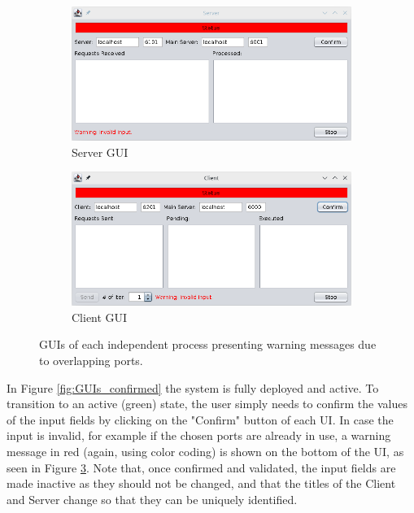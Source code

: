 \documentclass[12pt]{article}
\begin{document}
\begin{figure}[H]
  \centering
  \begin{subfigure}{.5\textwidth}
    \centering
    \includegraphics[width=.95\linewidth]{img/S_wrong.png}
    \caption{Server GUI}
    \label{fig:S_wrong}
  \end{subfigure}%
  \begin{subfigure}{.5\textwidth}
    \centering
    \includegraphics[width=.95\linewidth]{img/C_wrong.png}
    \caption{Client GUI}
    \label{fig:C_wrong}
  \end{subfigure}
  \caption{GUIs of each independent process presenting warning messages due to overlapping ports.}
  \label{fig:GUIs_wrong}
\end{figure}

In Figure \ref{fig:GUIs_confirmed} the system is fully deployed and active.
To transition to an active (green) state, the user simply needs to confirm the values of the input fields by clicking on the "Confirm" button of each UI.
In case the input is invalid, for example if the chosen ports are already in use, a warning message in red (again, using color coding) is shown on the bottom of
the UI, as seen in Figure \ref{fig:GUIs_wrong}.
Note that, once confirmed and validated, the input fields are made inactive as they should not be changed, and that the titles of the Client and Server change
so that they can be uniquely identified.
\end{document}
